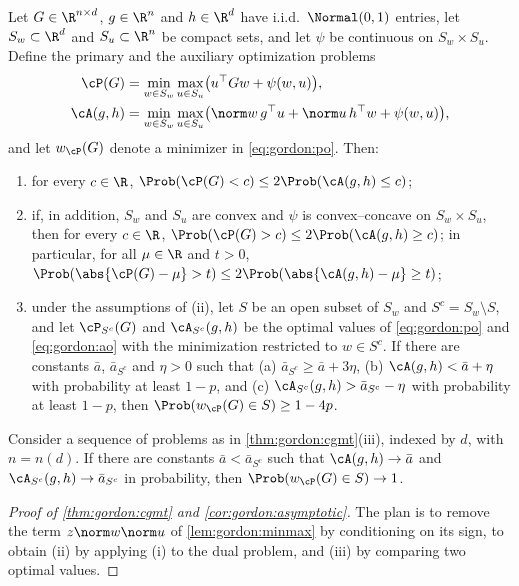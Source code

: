 \begin{refsection}
\begin{theorem}\label{thm:gordon:cgmt}
Let $G\in\R^{n\times d}$, $g\in\R^n$ and $h\in\R^d$ have i.i.d.\ $\Normal(0,1)$ entries, let $S_w\subset\R^d$ and $S_u\subset\R^n$ be compact sets, and let $\psi$ be continuous on $S_w\times S_u$. Define the primary and the auxiliary optimization problems
\begin{align}
\cP(G)&=\min_{w\in S_w}\max_{u\in S_u}\bigl(u^\top Gw+\psi(w,u)\bigr),\label{eq:gordon:po}\\
\cA(g,h)&=\min_{w\in S_w}\max_{u\in S_u}\bigl(\norm w\,g^\top u+\norm u\,h^\top w+\psi(w,u)\bigr),\label{eq:gordon:ao}
\end{align}
and let $w_{\cP}(G)$ denote a minimizer in \eqref{eq:gordon:po}. Then:
\begin{enumerate}
\item for every $c\in\R$, $\Prob(\cP(G)<c)\le2\Prob(\cA(g,h)\le c)$;
\item if, in addition, $S_w$ and $S_u$ are convex and $\psi$ is convex--concave on $S_w\times S_u$, then for every $c\in\R$, $\Prob(\cP(G)>c)\le2\Prob(\cA(g,h)\ge c)$; in particular, for all $\mu\in\R$ and $t>0$, $\Prob(\abs{\cP(G)-\mu}>t)\le2\Prob(\abs{\cA(g,h)-\mu}\ge t)$;
\item under the assumptions of (ii), let $S$ be an open subset of $S_w$ and $S^c=S_w\setminus S$, and let $\cP_{S^c}(G)$ and $\cA_{S^c}(g,h)$ be the optimal values of \eqref{eq:gordon:po} and \eqref{eq:gordon:ao} with the minimization restricted to $w\in S^c$. If there are constants $\bar a$, $\bar a_{S^c}$ and $\eta>0$ such that (a) $\bar a_{S^c}\ge\bar a+3\eta$, (b) $\cA(g,h)<\bar a+\eta$ with probability at least $1-p$, and (c) $\cA_{S^c}(g,h)>\bar a_{S^c}-\eta$ with probability at least $1-p$, then $\Prob(w_{\cP}(G)\in S)\ge1-4p$.
\end{enumerate}
\end{theorem}

\begin{corollary}\label{cor:gordon:asymptotic}
Consider a sequence of problems as in \cref{thm:gordon:cgmt}(iii), indexed by $d$, with $n=n(d)$. If there are constants $\bar a<\bar a_{S^c}$ such that $\cA(g,h)\to\bar a$ and $\cA_{S^c}(g,h)\to\bar a_{S^c}$ in probability, then $\Prob(w_{\cP}(G)\in S)\to1$.
\end{corollary}

\begin{proof}[Proof of \cref{thm:gordon:cgmt} and \cref{cor:gordon:asymptotic}]
The plan is to remove the term $z\norm w\norm u$ of \cref{lem:gordon:minmax} by conditioning on its sign, to obtain (ii) by applying (i) to the dual problem, and (iii) by comparing two optimal values.


\end{proof}
\end{refsection}
